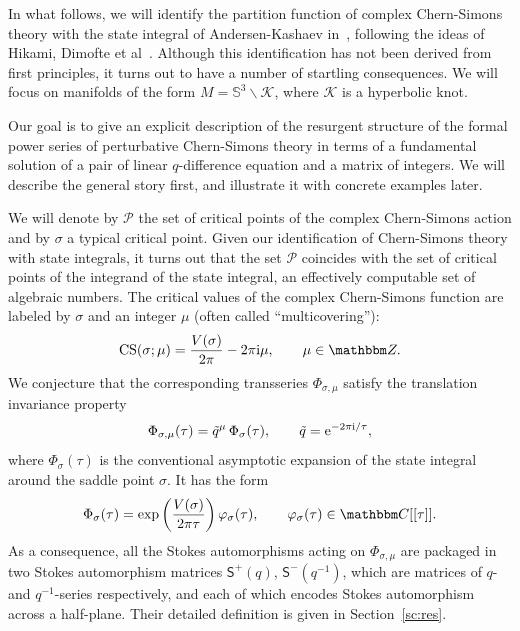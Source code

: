 \documentclass[12pt,reqno]{amsart}
\theoremstyle{definition}
\def\BZ{\mathbbm Z}
\def\BC{\mathbbm C}
\def\CK{\mathcal K}
\def\calP{\mathcal P}
\def\s{\sigma}
\def\tq{\tilde{q}}
\def\ri{\mathrm{i}}
\def\ri{{\rm i}}
\def\ms{\mathsf}
\begin{document}
In what follows, we will identify the partition function of complex
Chern-Simons theory with the state integral of Andersen-Kashaev
in~\cite{AK}, following the ideas of Hikami, Dimofte et
al~\cite{Hikami,DGLZ}.  Although this identification has not been
derived from first principles, it turns out to have a number of
startling consequences. We will focus on manifolds of the form
$M= \mathbb{S}^3 \backslash \mathcal{K}$, where $\CK$ is a hyperbolic
knot.

Our goal is to give an explicit description of the resurgent structure
of the formal power series of perturbative Chern-Simons theory in
terms of a fundamental solution of a pair of linear $q$-difference
equation and a matrix of integers. We will describe the general story
first, and illustrate it with concrete examples later.

We will denote by $\calP$ the set of critical points of the complex
Chern-Simons action and by $\s$ a typical critical point.  Given our
identification of Chern-Simons theory with state integrals, it turns
out that the set $\calP$ coincides with the set of critical points of
the integrand of the state integral, an effectively computable set of
algebraic numbers. The critical values of the complex Chern-Simons
function are labeled by $\s$ and an integer $\mu$ (often called
``multicovering''):
%
\begin{equation}
  \label{actions}
  \text{CS}(\s;\mu) =
  {V(\s) \over 2\pi} - 2\pi {\ri} \mu, \qquad \mu \in \BZ. 
\end{equation}
%
We conjecture that the corresponding transseries $ \Phi_{\s, \mu}$
satisfy the translation invariance property
%
\begin{equation}
  \label{Phiqt}
  \Phi_{\s,\mu}(\tau) = \tq^\mu \, \Phi_{\s}(\tau), \qquad
  \tq = {\rm e}^{-2\pi {\rm i}/\tau}, 
\end{equation}
%
where $\Phi_{\s}(\tau)$ is the conventional asymptotic expansion of
the state integral around the saddle point $\s$. It has the form
\begin{equation}
  \label{phi-ex}
  \Phi_{\s}(\tau)=
  \exp\left( { V(\s) \over 2\pi \tau} \right) \varphi_\s (\tau),
  \qquad \varphi_\s (\tau) \in \BC[[\tau]]. 
\end{equation}
%
As a consequence, all the Stokes automorphisms acting on
$\Phi_{\s,\mu}$ are packaged in two Stokes automorphism matrices
$\ms{S}^{+}(q)$, $\ms{S}^-(q^{-1})$, which are matrices of $q$- and
$q^{-1}$-series respectively, and each of which encodes Stokes
automorphism across a half-plane.  Their detailed definition is given
in Section~\ref{sc:res}.
\end{document}
